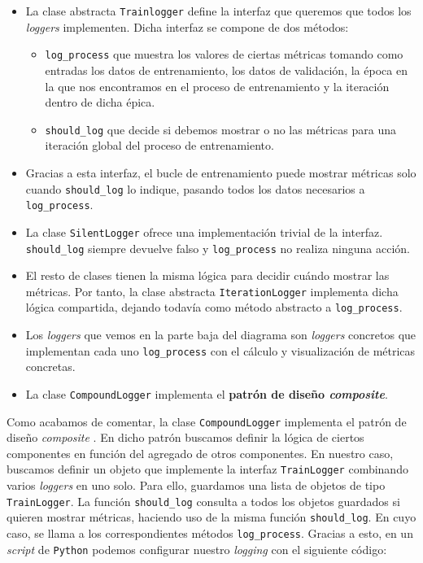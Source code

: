 \begin{itemize}
	\item La clase abstracta \lstinline{Trainlogger} define la interfaz que queremos que todos los \textit{loggers} implementen. Dicha interfaz se compone de dos métodos:
	      \begin{itemize}
		      \item \lstinline{log_process} que muestra los valores de ciertas métricas tomando como entradas los datos de entrenamiento, los datos de validación, la época en la que nos encontramos en el proceso de entrenamiento y la iteración dentro de dicha épica.
		      \item \lstinline{should_log} que decide si debemos mostrar o no las métricas para una iteración global del proceso de entrenamiento.
	      \end{itemize}
	\item Gracias a esta interfaz, el bucle de entrenamiento puede mostrar métricas solo cuando \lstinline{should_log} lo indique, pasando todos los datos necesarios a \lstinline{log_process}.
	\item La clase \lstinline{SilentLogger} ofrece una implementación trivial de la interfaz. \lstinline{should_log} siempre devuelve falso y \lstinline{log_process} no realiza ninguna acción.
	\item El resto de clases tienen la misma lógica para decidir cuándo mostrar las métricas. Por tanto, la clase abstracta \lstinline{IterationLogger} implementa dicha lógica compartida, dejando todavía como método abstracto a \lstinline{log_process}.
	\item Los \textit{loggers} que vemos en la parte baja del diagrama son \textit{loggers} concretos que implementan cada uno \lstinline{log_process} con el cálculo y visualización de métricas concretas.
	\item La clase \lstinline{CompoundLogger} implementa el \textbf{patrón de diseño \textit{composite}}.
\end{itemize}

Como acabamos de comentar, la clase \lstinline{CompoundLogger} implementa el patrón de diseño \textit{composite} \cite{informatica:design_patterns}. En dicho patrón buscamos definir la lógica de ciertos componentes en función del agregado de otros componentes. En nuestro caso, buscamos definir un objeto que implemente la interfaz \lstinline{TrainLogger} combinando varios \textit{loggers} en uno solo. Para ello, guardamos una lista de objetos de tipo \lstinline{TrainLogger}. La función \lstinline{should_log} consulta a todos los objetos guardados si quieren mostrar métricas, haciendo uso de la misma función \lstinline{should_log}. En cuyo caso, se llama a los correspondientes métodos \lstinline{log_process}. Gracias a esto, en un \textit{script} de \lstinline{Python} podemos configurar nuestro \textit{logging} con el siguiente código:

